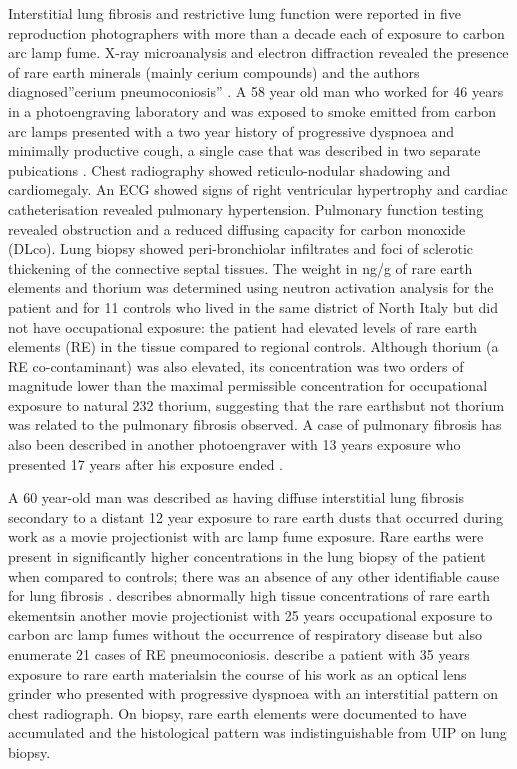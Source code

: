 \documentclass[a4paper,12pt]{article}
\begin{document}
Interstitial lung fibrosis and restrictive lung function were reported in five reproduction photographers with more than a decade each of exposure to carbon arc lamp fume. X-ray microanalysis and electron diffraction revealed the presence of rare earth minerals (mainly cerium compounds) and the authors diagnosed”cerium pneumoconiosis” \cite{Vogt1986}. A 58 year old man who worked for 46 years in a photoengraving laboratory and was exposed to smoke emitted from carbon arc lamps presented with a two year history of progressive dyspnoea and minimally productive cough, a single case that was described in two separate pubications \cite{Vocaturo1983, Sabbioni1982}. Chest radiography showed reticulo-nodular shadowing and cardiomegaly. An ECG showed signs of right ventricular hypertrophy and cardiac catheterisation revealed pulmonary hypertension. Pulmonary function testing revealed obstruction and a reduced diffusing capacity for carbon monoxide (DLco). Lung biopsy showed peri-bronchiolar infiltrates and foci of sclerotic thickening of the connective septal tissues. The weight in ng/g of rare earth elements and thorium was determined using neutron activation analysis for the patient and for 11 controls who lived in the same district of North Italy but did not have occupational exposure: the patient had elevated levels of rare earth elements (RE) in the tissue compared to regional controls. Although thorium (a RE co-contaminant) was also elevated, its concentration was two orders of magnitude lower than the maximal permissible concentration for occupational exposure to natural 232 thorium, suggesting that the rare earthsbut not thorium was related to the pulmonary fibrosis observed. A case of pulmonary fibrosis has also been described in another photoengraver with 13 years exposure who presented 17 years after his exposure ended \cite{Sulotto1986}.

A 60 year-old man was described as having diffuse interstitial lung fibrosis secondary to a distant 12 year exposure to rare earth  dusts that occurred during work as a movie projectionist with arc lamp fume exposure. Rare earths were present in significantly higher concentrations in the lung biopsy of the patient when compared to controls; there was an absence of any other identifiable cause for lung fibrosis \cite{Porru2001}. \cite{Waring1990} describes abnormally high tissue concentrations of rare earth ekementsin another movie projectionist with 25 years occupational exposure to carbon arc lamp fumes without the occurrence of respiratory disease but also enumerate 21 cases of RE pneumoconiosis. \cite{McDonald1995} describe a patient with 35 years exposure to rare earth materialsin the course of his work as an optical lens grinder who presented with progressive dyspnoea with an interstitial pattern on chest radiograph. On biopsy, rare earth elements were documented to have accumulated and the histological pattern was indistinguishable from UIP on lung biopsy.
\end{document}
